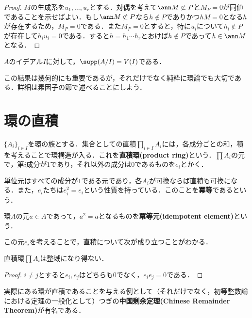 \begin{proof}
	$M$の生成系を$u_1,\dots,u_r$とする．対偶を考えて$\ann M\not\subset P$と$M_P=0$が同値であることを示せばよい．もし$\ann M\not\subset P$なら$h\not\in P$でありかつ$hM=0$となる$h$が存在するため，$M_P=0$である．また$M_P=0$とすると，特に$u_i$について$h_i\not\in P$が存在して$h_iu_i=0$である．すると$h=h_1\cdots h_r$とおけば$h\not\in P$であって$h\in\ann M$となる．
\end{proof}

\begin{cor}\label{cor:supp A/I}
	$A$のイデアル$I$に対して，$\supp (A/I)=V(I)$である．
\end{cor}

この結果は幾何的にも重要であるが，それだけでなく純粋に環論でも大切である．詳細は素因子の節で述べることにしよう．

\section{環の直積}

\begin{defi}[直積環]
	$\{A_i\}_{i\in I}$を環の族とする．集合としての直積$\prod_{i\in I} A_i$には，各成分ごとの和，積を考えることで環構造が入る．これを\textbf{直積環(product ring)}という．$\prod A_i$の元で，第$i$成分が$1$であり，それ以外の成分は$0$であるものを$e_i$とかく．
\end{defi}

単位元はすべての成分が$1$である元であり，各$A_i$が可換ならば直積も可換になる．また，$e_i$たちは$e_i^2=e_i$という性質を持っている．このことを\textbf{冪等}であるという．
\begin{defi}[冪等元]
	環$A$の元$a\in A$であって，$a^2=a$となるものを\textbf{冪等元(idempotent element)}という．
\end{defi}

この元$e_i$を考えることで，直積について次が成り立つことがわかる．

\begin{prop}
	直積環$\prod A_i$は整域になり得ない．
\end{prop}

\begin{proof}
	$i\neq j$とすると$e_i,e_j$はどちらも0でなく，$e_ie_j=0$である．
\end{proof}

実際にある環が直積であることを与える例として（それだけでなく，初等整数論における定理の一般化として）つぎの\textbf{中国剰余定理(Chinese Remainder Theorem)}が有名である．

